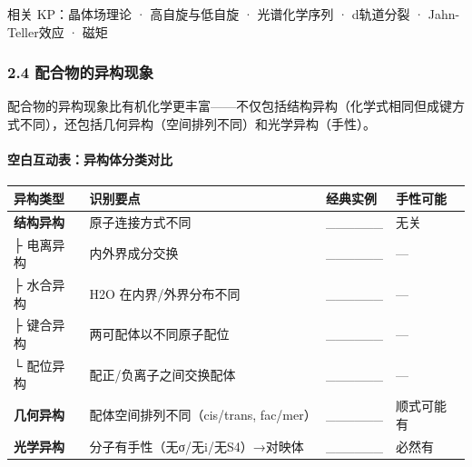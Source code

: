 \documentclass[a4paper,11pt]{ctexart}
\newcounter{none}
\begin{document}
相关 KP：晶体场理论 · 高自旋与低自旋 · 光谱化学序列 · d轨道分裂 · Jahn-Teller效应 · 磁矩

\subsubsection{2.4 配合物的异构现象}\label{ux914dux5408ux7269ux7684ux5f02ux6784ux73b0ux8c61}

配合物的异构现象比有机化学更丰富------不仅包括结构异构（化学式相同但成键方式不同），还包括几何异构（空间排列不同）和光学异构（手性）。

\paragraph{空白互动表：异构体分类对比}\label{ux7a7aux767dux4e92ux52a8ux8868ux5f02ux6784ux4f53ux5206ux7c7bux5bf9ux6bd4}

{\def\LTcaptype{none} %
\begin{longtable}[]{@{}
  >{\centering\arraybackslash}p{}
  >{\raggedright\arraybackslash}p{}
  >{\raggedright\arraybackslash}p{}
  >{\centering\arraybackslash}p{}@{}}
\toprule\noalign{}
\begin{minipage}[b]{\linewidth}\centering
异构类型
\end{minipage} & \begin{minipage}[b]{\linewidth}\raggedright
识别要点
\end{minipage} & \begin{minipage}[b]{\linewidth}\raggedright
经典实例
\end{minipage} & \begin{minipage}[b]{\linewidth}\centering
手性可能
\end{minipage} \\
\midrule\noalign{}
\endhead
\bottomrule\noalign{}
\endlastfoot
\textbf{结构异构} & 原子连接方式不同 & \_\_\_\_\_\_ & 无关 \\
├ 电离异构 & 内外界成分交换 & \_\_\_\_\_\_ & --- \\
├ 水合异构 & H2O 在内界/外界分布不同 & \_\_\_\_\_\_ & --- \\
├ 键合异构 & 两可配体以不同原子配位 & \_\_\_\_\_\_ & --- \\
└ 配位异构 & 配正/负离子之间交换配体 & \_\_\_\_\_\_ & --- \\
\textbf{几何异构} & 配体空间排列不同（cis/trans, fac/mer） & \_\_\_\_\_\_ & 顺式可能有 \\
\textbf{光学异构} & 分子有手性（无σ/无i/无S4）→对映体 & \_\_\_\_\_\_ & 必然有 \\
\end{longtable}
}
\end{document}
